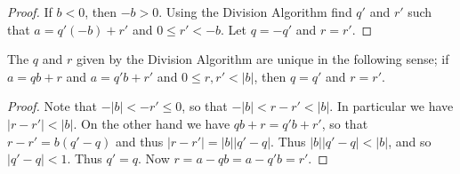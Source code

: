 \documentclass{article}
\begin{document}
\begin{proof}
If $b < 0$, then $-b > 0$. Using the Division Algorithm find $q'$ and $r'$ such that $a = q'(-b) + r'$ and $0 \leq r' < -b$. Let $q = -q'$ and $r = r'$.
\end{proof}

\begin{cor}
The $q$ and $r$ given by the Division Algorithm are unique in the following sense; if $a = qb + r$ and $a = q'b + r'$ and $0 \leq r,r' < |b|$, then $q = q'$ and $r = r'$.
\end{cor}

\begin{proof}
Note that $-|b| < -r' \leq 0$, so that $-|b| < r-r' < |b|$. In particular we have $|r-r'| < |b|$. On the other hand we have $qb+r = q'b+r'$, so that $r-r' = b(q'-q)$ and thus $|r-r'| = |b||q'-q|$. Thus $|b||q'-q| < |b|$, and so $|q'-q| < 1$. Thus $q' = q$. Now $r = a - qb = a - q'b = r'$.
\end{proof}
\end{document}
